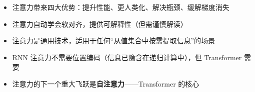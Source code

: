 \begin{itemize}
    \item 注意力带来四大优势：提升性能、更人类化、解决瓶颈、缓解梯度消失
    \item 注意力自动学会软对齐，提供可解释性（但需谨慎解读）
    \item 注意力是通用技术，适用于任何``从值集合中按需提取信息''的场景
    \item RNN 注意力不需要位置编码（信息已隐含在递归计算中），但 Transformer 需要
    \item 注意力的下一个重大飞跃是\textbf{自注意力}——Transformer 的核心
\end{itemize}


